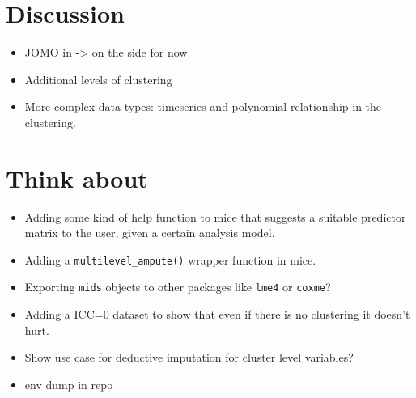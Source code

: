 \documentclass[
]{jss}
\begin{document}
\hypertarget{discussion}{%
\section{Discussion}\label{discussion}}

\begin{itemize}
\item
  JOMO in  -\textgreater{} on the side for now
\item
  Additional levels of clustering
\item
  More complex data types: timeseries and polynomial relationship in the
  clustering.
\end{itemize}

\hypertarget{think-about}{%
\section{Think about}\label{think-about}}

\begin{itemize}
\item
  Adding some kind of help function to mice that suggests a suitable
  predictor matrix to the user, given a certain analysis model.
\item
  Adding a \texttt{multilevel\_ampute()} wrapper function in mice.
\item
  Exporting \texttt{mids} objects to other packages like \texttt{lme4}
  or \texttt{coxme}?
\item
  Adding a ICC=0 dataset to show that even if there is no clustering it
  doesn't hurt.
\item
  Show use case for deductive imputation for cluster level variables?
\item
  env dump in repo
\end{itemize}

\renewcommand\refname{References}

\end{document}
